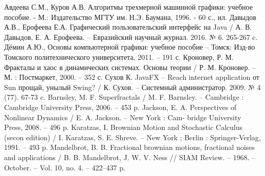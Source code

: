 



\begin{thebibliography}{9} 
	 Авдеева С.М., Куров А.В. Алгоритмы трехмерной машинной графики: учебное пособие. - М.: Издательство МГТУ им. Н.Э. Баумана, 1996. - 60 с., ил.
	 Давыдов А.В., Ерофеева Е.А. Графический пользовательский интерфейс на Java / А. В. Давыдов, Е. А. Ерофеева. -- Евразийский научный журнал. 2016. № 6. 265-267 c.
	 Дёмин А.Ю., Основы компьютерной графики: учебное пособие – Томск: Изд-во Томского политехнического университета, 2011. – 191 с.
	 Кроновер, Р. М. Фракталы и хаос в динамических системах. Основы теории / Р. М. Кроновер. -- М. : Постмаркет, 2000. -- 352 с.
	 Сухов К. JavaFX – Reach internet application от Sun прощай, унылый Swing? / К. Сухов. -- Системный администратор. 2009. № 4 (77). 67-73 c.
	 Barnsley, M. F. Superfractals / M. F. Barnsley. -- Cambridge : Cambridge University Press, 2006. -- 453 p.
	 Jackson, E. A. Perspectives of Nonlinear Dynamics / E. A. Jackson. -- New York : Cam- bridge University Press, 2008. -- 496 p.
	 Karatzas, I. Brownian Motion and Stochastic Calculus (secon edition) / I. Karatzas,
	S. E. Shreve. -- New York ; Berlin : Springer-Verlag, 1991. -- 493 p.
	 Mandelbrot, B. B. Fractional brownian motions, fractional noises and applications / B. B. Mandelbrot, J. W. V. Ness // SIAM Review. -- 1968. -- October. -- Vol. 10, no. 4. -- 422–437 p. 
 \end{thebibliography}